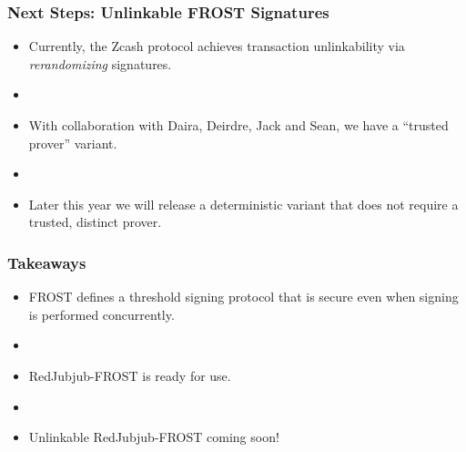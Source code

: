 \documentclass[hyperref={pdfpagelabels=true},table,dvipsnames,14pt,aspectratio=169]{beamer}
\begin{document}
\begin{frame}
  \frametitle{Next Steps: Unlinkable FROST Signatures}

  \begin{itemize}
    \item<1-> Currently, the Zcash protocol achieves transaction unlinkability via \emph{rerandomizing} signatures.
    \item[]
    \item<2-> With collaboration with Daira, Deirdre, Jack and Sean, we have a ``trusted prover'' variant.
    \item[]
    \item<3-> Later this year we will release a deterministic variant that does not require a trusted, distinct prover.
  \end{itemize}
\end{frame}

\begin{frame}
  \frametitle{Takeaways}
  \begin{itemize}
    \item<1-> FROST defines a threshold signing protocol that is
      secure even when signing is performed concurrently.
    \item[]
    \item<2-> RedJubjub-FROST is ready for use.
    \item[]
    \item<3-> Unlinkable RedJubjub-FROST coming soon!
  \end{itemize}
\end{frame}

\begin{comment}
\begin{frame}
  \huge
  \centering
  EXTRAS
\end{frame}
\end{comment}
\end{document}
